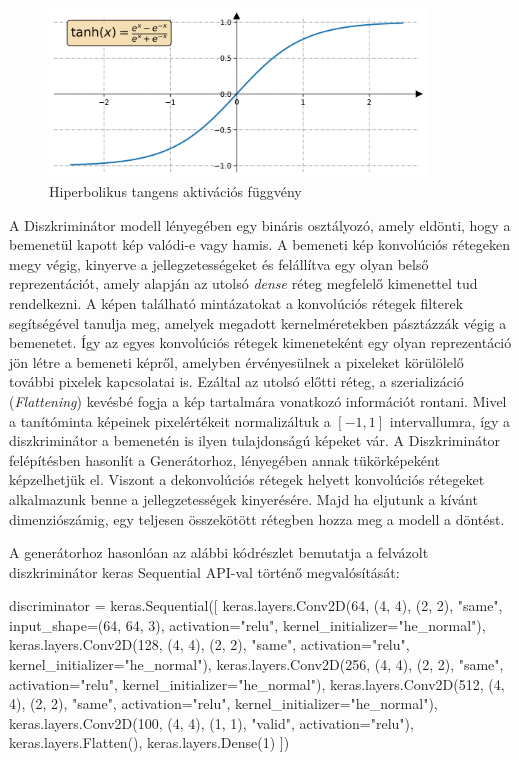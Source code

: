 \begin{figure}[h]
\centering
\includegraphics[width=10cm]{images/tanh.png}
\caption{Hiperbolikus tangens aktivációs függvény}
\label{fig:tanh}
\end{figure}


A Diszkriminátor modell lényegében egy bináris osztályozó, amely eldönti, hogy a bemenetül kapott kép valódi-e vagy hamis. A bemeneti kép konvolúciós rétegeken megy végig, kinyerve a jellegzetességeket és felállítva egy olyan belső reprezentációt, amely alapján az utolsó \textit{dense} réteg megfelelő kimenettel tud rendelkezni. A képen található mintázatokat a konvolúciós rétegek filterek segítségével tanulja meg, amelyek megadott kernelméretekben pásztázzák végig a bemenetet. Így az egyes konvolúciós rétegek kimeneteként egy olyan reprezentáció jön létre a bemeneti képről, amelyben érvényesülnek a pixeleket körülölelő további pixelek kapcsolatai is. Ezáltal az utolsó előtti réteg, a szerializáció (\textit{Flattening}) kevésbé fogja a kép tartalmára vonatkozó információt rontani. Mivel a tanítóminta képeinek pixelértékeit normalizáltuk a $[-1, 1]$ intervallumra, így a diszkriminátor a bemenetén is ilyen tulajdonságú képeket vár. A Diszkriminátor felépítésben hasonlít a Generátorhoz, lényegében annak tükörképeként képzelhetjük el. Viszont a dekonvolúciós rétegek helyett konvolúciós rétegeket alkalmazunk benne a jellegzetességek kinyerésére. Majd ha eljutunk a kívánt dimenziószámig, egy teljesen összekötött rétegben hozza meg a modell a döntést.

A generátorhoz hasonlóan az alábbi kódrészlet bemutatja a felvázolt diszkriminátor keras Sequential API-val történő megvalósítását:
\begin{python}
discriminator = keras.Sequential([
    keras.layers.Conv2D(64, (4, 4), (2, 2), "same",
                        input_shape=(64, 64, 3), activation="relu",
                        kernel_initializer="he_normal"),
    keras.layers.Conv2D(128, (4, 4), (2, 2), "same", activation="relu",
                        kernel_initializer="he_normal"),
    keras.layers.Conv2D(256, (4, 4), (2, 2), "same", activation="relu",
                        kernel_initializer="he_normal"),
    keras.layers.Conv2D(512, (4, 4), (2, 2), "same", activation="relu",
                        kernel_initializer="he_normal"),
    keras.layers.Conv2D(100, (4, 4), (1, 1), "valid", activation="relu"),
    keras.layers.Flatten(),
    keras.layers.Dense(1)
])
\end{python}

